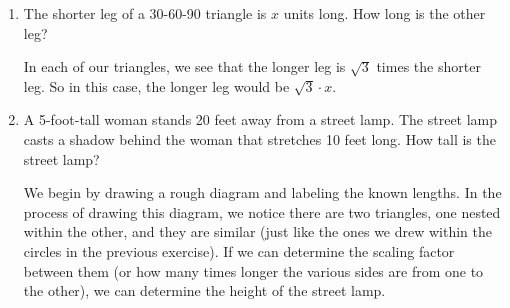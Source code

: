 \documentclass[main]{subfiles}
\begin{document}
\begin{enumerate}[resume]
\item
\begin{problem}
The shorter leg of a 30-60-90 triangle is $x$ units long. How long is the other leg?
\end{problem}
\pspace{\vfill}

\begin{solution}
    In each of our triangles, we see that the longer leg is $\sqrt{3}$ times the shorter leg. So in this case, the longer leg would be $\sqrt{3}\cdot x$.
\end{solution}

\pspace{\newpage}

\item
\begin{problem}
A 5-foot-tall woman stands 20 feet away from a street lamp. The street lamp casts a shadow behind the woman that stretches 10 feet long. How tall is the street lamp?
\end{problem}
\pspace{\vfill}

\begin{solution}
    \begin{center}
    \end{center}

    We begin by drawing a rough diagram and labeling the known lengths. In the process of drawing this diagram, we notice there are two triangles, one nested within the other, and they are similar (just like the ones we drew within the circles in the previous exercise). If we can determine the scaling factor between them (or how many times longer the various sides are from one to the other), we can determine the height of the street lamp. \\
    

\end{solution}
\end{enumerate}
\end{document}
